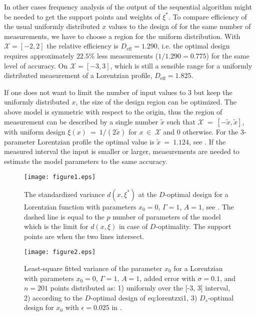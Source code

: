 \documentclass[12pt]{iopart}
\begin{document}
In other cases frequency analysis of the output of the sequential algorithm might be needed to get the support points and weights of $\xi^*$.
To compare efficiency of the usual uniformly distributed $x$ values to the design of  for the same number of measurements, we have to choose a region for the uniform distribution. With $\mathcal{X} = [-2, 2]$ the relative efficiency is $D_\mathrm{eff} = 1.290$, i.e. the optimal design requires approximately $22.5\%$ less measurements ($1/1.290 = 0.775$) for the same level of accuracy. On $\mathcal{X} =[-3, 3]$, which is still a sensible range for a uniformly distributed measurement of a Lorentzian profile, $D_\mathrm{eff} = 1.825$.

If one does not want to limit the number of input values to 3 but keep the uniformly distributed $x$, the size of the design region can be optimized. The above model is symmetric with respect to the origin, thus the region of measurement can be described by a single number $\tilde x$ such that $\mathcal{X}~=~[-\tilde x, \tilde x]$, with uniform design $\xi(x)~=~1/({2 \tilde x})$ for $x~\in~\mathcal{X}$ and $0$ otherwise. For the 3-parameter Lorentzian profile the optimal value is $\tilde x~=~1.124$, see . If the measured interval the input is smaller or larger, measurements are needed to estimate the model parameters to the same accuracy.

\begin{figure}
\texttt{[image: figure1.eps]}
\caption{The standardized variance $d(x, \xi^*)$ at the $D$-optimal design for a Lorentzian function with parameters $x_0=0$, $\Gamma = 1$, $A = 1$, see . The dashed line is equal to the $p$ number of parameters of the model which is the limit for $d(x, \xi)$ in case of $D$-optimality. The support points are when the two lines intersect.}
\label{fig:lorentz3d}
\end{figure}

\begin{figure}
\texttt{[image: figure2.eps]}
\caption{Least-square fitted variance of the parameter $x_0$ for a Lorentzian with parameters $x_0=0$, $\Gamma = 1$, $A = 1$, added error with $\sigma=0.1$, and $n=201$ points distributed as: 1) uniformly over the [-3, 3] interval, 2) according to the $D$-optimal design of {eq:lorentzxi1}, 3) $D_s$-optimal design for $x_0$ with $\epsilon = 0.025$ in .}
\label{fig:simvariance}
\end{figure}
\end{document}
